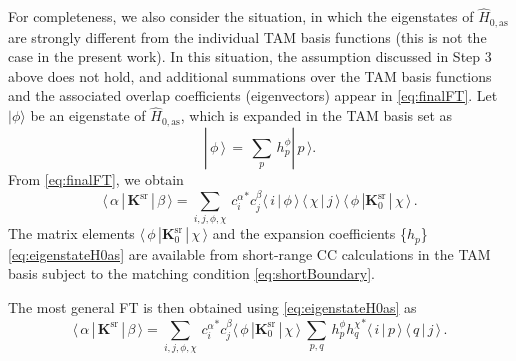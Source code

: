 \documentclass[reprint,amssymb,noeprint,twocolumn,longbibliography]{revtex4-2}
\begin{document}
\vspace{0.3cm}
For completeness, we also consider the situation, in which the eigenstates of $\hat{H}_{0,\text{as}}$ are strongly different from the individual TAM basis functions (this is not the case in the present work). In this situation, the assumption discussed in Step 3 above does not hold, and additional summations over the TAM basis functions and the associated overlap coefficients (eigenvectors) appear in \cref{eq:finalFT}. Let $|\phi\rangle$ be an eigenstate of $\hat{H}_{0,\text{as}}$, which is expanded in the TAM basis set as 
\begin{equation}
\label{eq:eigenstateH0as}
|\, \phi\, \rangle\, =\,  \sum_{p}^{}\, h_p^\phi |\, p \, \rangle.
\end{equation}
From \cref{eq:finalFT}, we obtain 
\begin{equation}
\label{eq:finalFT2}
\langle\, \alpha\, |\, \bm{K}^\text{sr}\, |\, \beta\, \rangle 
 =  \sum_{i,j,\phi,\chi}^{}\, {c_i^\alpha}^\ast c_j^\beta \langle\, i\, |\,\phi \,\rangle\, \langle\, \chi \, |\,j\,\rangle\,  \langle\, \phi \, |\bm{K}_0^\text{sr}\,|\, \chi \, \rangle\,.
\end{equation}
The matrix elements $\langle\, \phi \, |\bm{K}_0^\text{sr}\,|\, \chi \, \rangle$ and the expansion coefficients \{$h_p$\}  \cref{eq:eigenstateH0as} are available from short-range CC calculations in the TAM basis  subject to the matching condition \cref{eq:shortBoundary}. 


The most general FT is then obtained using \cref{eq:eigenstateH0as} as  
\begin{equation}
\label{eq:finalFT3}
\langle\, \alpha\, |\, \bm{K}^\text{sr}\, |\, \beta\, \rangle 
 =  \sum_{i,j,\phi,\chi}^{}\, {c_i^\alpha}^\ast c_j^\beta 
 \langle\, \phi \, |\bm{K}_0^\text{sr}\,|\, \chi \, \rangle\
 \sum_{p,q}^{}\, 
 {h_p^\phi} {h_q^\chi}^\ast  \langle\, i\, |\,p \,\rangle\, \langle\, q \, |\,j\,\rangle\,.
\end{equation}
\end{document}
